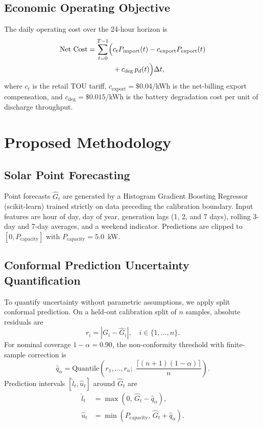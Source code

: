 \documentclass[conference]{IEEEtran}
\begin{document}
\subsection{Economic Operating Objective}
The daily operating cost over the 24-hour horizon is
\begin{equation}
\begin{split}
\text{Net Cost} = \sum_{t=0}^{T-1} \Bigl( & c_t P_{\text{import}}(t) - c_{\text{export}} P_{\text{export}}(t) \\
& + c_{\text{deg}}\, p_d(t) \Bigr) \Delta t,
\end{split}
\end{equation}
where $c_t$ is the retail TOU tariff, $c_{\text{export}} = \$0.04$/kWh is the net-billing export compensation, and $c_{\text{deg}} = \$0.015$/kWh is the battery degradation cost per unit of discharge throughput.

\section{Proposed Methodology}

\subsection{Solar Point Forecasting}
Point forecasts $\hat{G}_t$ are generated by a Histogram Gradient Boosting Regressor (scikit-learn) trained strictly on data preceding the calibration boundary. Input features are hour of day, day of year, generation lags (1, 2, and 7 days), rolling 3-day and 7-day averages, and a weekend indicator. Predictions are clipped to $[0, P_{\text{capacity}}]$ with $P_{\text{capacity}} = 5.0$~kW.

\subsection{Conformal Prediction Uncertainty Quantification}
To quantify uncertainty without parametric assumptions, we apply split conformal prediction. On a held-out calibration split of $n$ samples, absolute residuals are
\begin{equation}
r_i = |G_i - \hat{G}_i|, \quad i \in \{1, \dots, n\}.
\end{equation}
For nominal coverage $1-\alpha = 0.90$, the non-conformity threshold with finite-sample correction is
\begin{equation}
\hat{q}_\alpha = \text{Quantile}\!\left(r_1, \dots, r_n;\; \frac{\lceil(n+1)(1-\alpha)\rceil}{n}\right).
\end{equation}
Prediction intervals $[\hat{l}_t, \hat{u}_t]$ around $\hat{G}_t$ are
\begin{equation}
\begin{split}
\hat{l}_t &= \max(0,\, \hat{G}_t - \hat{q}_\alpha), \\
\hat{u}_t &= \min(P_{\text{capacity}},\, \hat{G}_t + \hat{q}_\alpha).
\end{split}
\end{equation}
\end{document}
